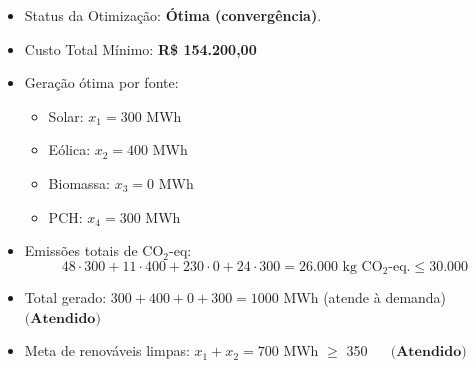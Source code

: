 \documentclass[12pt]{article}
\begin{document}
\begin{itemize}
    \item Status da Otimização: \textbf{Ótima (convergência)}.
    \item Custo Total Mínimo: \textbf{R\$ 154.200,00}
    \item Geração ótima por fonte:
    \begin{itemize}
        \item Solar: $x_1 = 300$ MWh
        \item Eólica: $x_2 = 400$ MWh
        \item Biomassa: $x_3 = 0$ MWh
        \item PCH: $x_4 = 300$ MWh
    \end{itemize}
    \item Emissões totais de CO$_2$-eq:
    \[
    48 \cdot 300 + 11 \cdot 400 + 230 \cdot 0 + 24 \cdot 300 = 26.000 \text{ kg CO$_2$-eq.} \leq 30.000
    \]
    \item Total gerado: $300 + 400 + 0 + 300 = 1000$ MWh (atende à demanda) $\textbf{(Atendido)}$
    \item Meta de renováveis limpas: $x_1 + x_2 = 700$ MWh $\geq$ 350 $\quad$ $\textbf{(Atendido)}$
\end{itemize}
\end{document}
